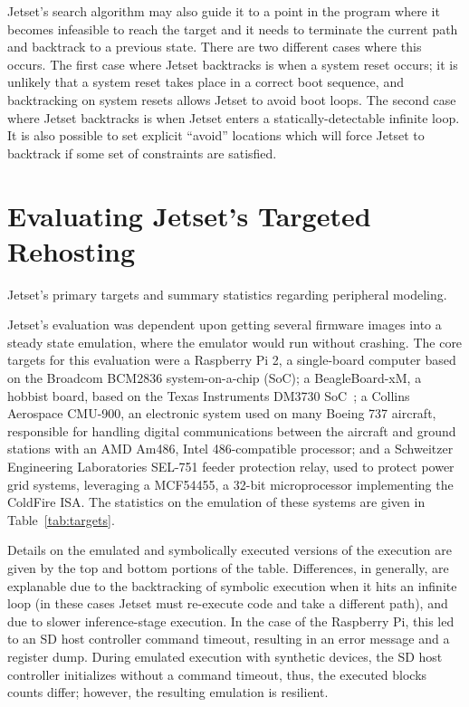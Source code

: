 Jetset's search algorithm may also guide it to a point in the program where it becomes infeasible to reach the target and it needs to terminate the current path and backtrack to a previous state.
There are two different cases where this occurs.
The first case where Jetset backtracks is when a system reset occurs; it is unlikely that a system reset takes place in a correct boot sequence, and backtracking on system resets allows Jetset to avoid boot loops.
The second case where Jetset backtracks is when Jetset enters a statically-detectable infinite loop.
It is also possible to set explicit ``avoid'' locations which will force Jetset to backtrack if some set of constraints are satisfied.

\section{Evaluating Jetset's Targeted Rehosting}


\begin{table}
\centering
\caption{Jetset's primary targets and summary statistics regarding peripheral modeling.}
\label{tab:targets}

\end{table}

Jetset's evaluation was dependent upon getting several firmware images into a steady state emulation, where the emulator would run without crashing.
The core targets for this evaluation were a Raspberry Pi 2, a single-board computer based on the Broadcom BCM2836 system-on-a-chip (SoC); a BeagleBoard-xM, a hobbist board, based on the Texas Instruments DM3730 SoC~\cite{bbxm-srm}; a Collins Aerospace CMU-900, an electronic system used on many Boeing 737 aircraft, responsible for handling digital communications between the aircraft and ground stations with an AMD Am486, Intel 486-compatible processor; and a Schweitzer Engineering Laboratories SEL-751 feeder protection relay, used to protect power grid systems, leveraging a MCF54455, a 32-bit microprocessor implementing the ColdFire ISA.
The statistics on the emulation of these systems are given in Table~\ref{tab:targets}.

Details on the emulated and symbolically executed versions of the execution are given by the top and bottom portions of the table. 
Differences, in generally, are explanable due to the backtracking of symbolic execution when it hits an infinite loop (in these cases Jetset must re-execute code and take a different path), and due to slower inference-stage execution.
In the case of the Raspberry Pi, this led to an SD host controller command timeout, resulting in an error message and a register dump. 
During emulated execution with synthetic devices, the SD host controller initializes without a command timeout, thus, the executed blocks counts differ; however, the resulting emulation is resilient. 

